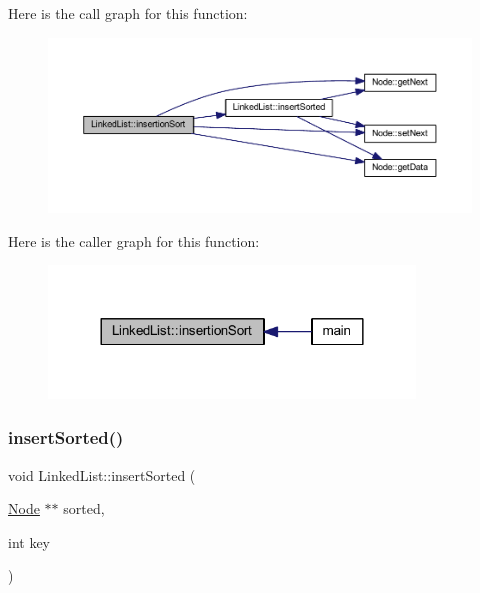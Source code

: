 Here is the call graph for this function\+:
\nopagebreak
\begin{figure}[H]
\begin{center}
\leavevmode
\includegraphics[width=350pt]{class_linked_list_a04e277f98f8e6e5426f19ad780915e00_cgraph}
\end{center}
\end{figure}
Here is the caller graph for this function\+:
\nopagebreak
\begin{figure}[H]
\begin{center}
\leavevmode
\includegraphics[width=276pt]{class_linked_list_a04e277f98f8e6e5426f19ad780915e00_icgraph}
\end{center}
\end{figure}
\mbox{\label{class_linked_list_ac517f07c7f197202fa085246fb3f07e8}} 
\subsubsection{\texorpdfstring{insert\+Sorted()}{insertSorted()}}
{\footnotesize\ttfamily void Linked\+List\+::insert\+Sorted (\begin{DoxyParamCaption}\item[{\hyperlink{class_node}{Node} $\ast$$\ast$}]{sorted,  }\item[{int}]{key }\end{DoxyParamCaption})}

